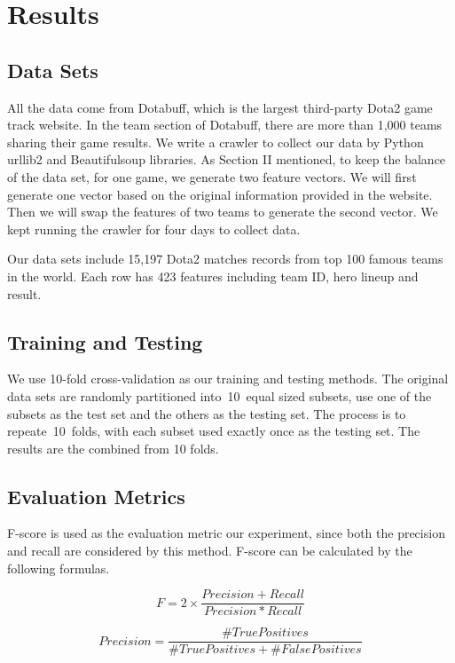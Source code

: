 \section{Results}
\subsection{Data Sets}
All the data come from Dotabuff, which is the largest third-party Dota2 game track website.
In the team section of Dotabuff, there are more than 1,000 teams sharing their game results.
We write a crawler to collect our data by Python urllib2 and Beautifulsoup libraries.
As Section II mentioned, to keep the balance of the data set, for one game, we generate two feature vectors.
We will first generate one vector based on the original information provided in the website.
Then we will swap the features of two teams to generate the second vector.
We kept running the crawler for four days to collect data.

Our data sets include 15,197 Dota2 matches records from top 100 famous teams in the world.
Each row has 423 features including team ID, hero lineup and result.

\subsection{Training and Testing}
We use 10-fold cross-validation as our training and testing methods.
The original data sets are randomly partitioned into 10 equal sized subsets, use one of the subsets as the test set and the others as the testing set.
The process is to repeate 10 folds, with each subset used exactly once as the testing set.
The results are the combined from 10 folds.


\subsection{Evaluation Metrics}
F-score is used as the evaluation metric our experiment, since both the precision and recall are considered by this method.
F-score can be calculated by the following formulas.


\begin{equation}
F=2\times\frac{Precision+Recall}{Precision*Recall}
\end{equation}

\begin{equation}
Precision = \frac{\#TruePositives}{\#TruePositives+\#FalsePositives}
\end{equation}


